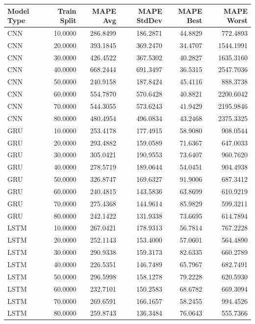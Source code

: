 \begin{tabular}{lrrrrr}
\toprule
Model Type & Train Split & MAPE Avg & MAPE StdDev & MAPE Best & MAPE Worst \\
\midrule
CNN & 10.0000 & 286.8499 & 186.2871 & 44.8829 & 772.4893 \\
CNN & 20.0000 & 393.1845 & 369.2470 & 34.4707 & 1544.1991 \\
CNN & 30.0000 & 426.4522 & 367.5302 & 40.2827 & 1635.3160 \\
CNN & 40.0000 & 668.2444 & 691.3497 & 36.5315 & 2547.7036 \\
CNN & 50.0000 & 240.9158 & 187.8424 & 45.4116 & 888.3738 \\
CNN & 60.0000 & 554.7870 & 570.6428 & 40.8821 & 2200.6042 \\
CNN & 70.0000 & 544.3055 & 573.6243 & 41.9429 & 2195.9846 \\
CNN & 80.0000 & 480.4954 & 496.0834 & 43.2468 & 2375.3325 \\
GRU & 10.0000 & 253.4178 & 177.4915 & 58.9080 & 908.0544 \\
GRU & 20.0000 & 293.4882 & 159.0589 & 71.6367 & 647.0033 \\
GRU & 30.0000 & 305.0421 & 190.9553 & 73.6407 & 960.7620 \\
GRU & 40.0000 & 278.5719 & 189.0644 & 54.0451 & 904.4938 \\
GRU & 50.0000 & 326.8747 & 169.6327 & 91.9006 & 687.3412 \\
GRU & 60.0000 & 240.4815 & 143.5836 & 63.8699 & 610.9219 \\
GRU & 70.0000 & 275.4368 & 144.9614 & 85.9829 & 599.3211 \\
GRU & 80.0000 & 242.1422 & 131.9338 & 73.6695 & 614.7894 \\
LSTM & 10.0000 & 267.0421 & 178.9313 & 56.7814 & 767.2228 \\
LSTM & 20.0000 & 252.1143 & 153.4000 & 57.0601 & 564.4890 \\
LSTM & 30.0000 & 290.9338 & 159.3173 & 82.6335 & 660.2789 \\
LSTM & 40.0000 & 226.5351 & 146.7489 & 65.7967 & 682.7491 \\
LSTM & 50.0000 & 296.5998 & 158.1278 & 79.2228 & 620.5930 \\
LSTM & 60.0000 & 232.7101 & 150.2583 & 68.6782 & 669.3094 \\
LSTM & 70.0000 & 269.6591 & 166.1657 & 58.2455 & 994.4526 \\
LSTM & 80.0000 & 259.8743 & 136.3484 & 76.0643 & 555.7366 \\

\end{tabular}

